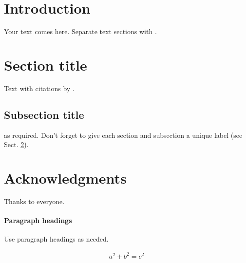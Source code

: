 \documentclass[smallextended]{svjour3}       %
\begin{document}
\hypertarget{intro}{%
\section{Introduction}\label{intro}}

Your text comes here. Separate text sections with \cite{Mislevy06Cog}.

\hypertarget{sec:1}{%
\section{Section title}\label{sec:1}}

Text with citations by \cite{Galyardt14mmm}.

\hypertarget{sec:2}{%
\subsection{Subsection title}\label{sec:2}}

as required. Don't forget to give each section and subsection a unique
label (see Sect. \ref{sec:1}).

\hypertarget{acknow}{%
\section{Acknowledgments}\label{acknow}}

Thanks to everyone.

\hypertarget{paragraph-headings}{%
\paragraph{Paragraph headings}\label{paragraph-headings}}

Use paragraph headings as needed.

\begin{align}
a^2+b^2=c^2
\end{align}



\end{document}
